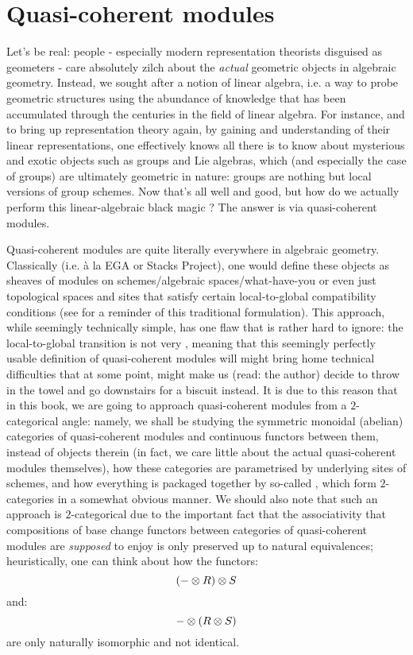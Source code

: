    \section{Quasi-coherent modules} \label{section: qcoh}
        Let's be real: people - especially modern representation theorists disguised as geometers - care absolutely zilch about the \textit{actual} geometric objects in algebraic geometry. Instead, we sought after a notion of  linear algebra, i.e. a way to probe geometric structures using the abundance of knowledge that has been accumulated through the centuries in the field of linear algebra. For instance, and to bring up representation theory again, by gaining and understanding of their linear representations, one effectively knows all there is to know about mysterious and exotic objects such as groups and Lie algebras, which (and especially the case of groups) are ultimately geometric in nature: groups are nothing but local versions of group schemes. Now that's all well and good, but how do we actually perform this linear-algebraic black magic ? The answer is via quasi-coherent modules.
        
        Quasi-coherent modules are quite literally everywhere in algebraic geometry. Classically (i.e. \`a la EGA or Stacks Project), one would define these objects as sheaves of modules on schemes/algebraic spaces/what-have-you or even just topological spaces and sites that satisfy certain local-to-global compatibility conditions (see \cite[\href{https://stacks.math.columbia.edu/tag/01BD}{Tag 01BD}]{stacks} for a reminder of this traditional formulation). This approach, while seemingly technically simple, has one flaw that is rather hard to ignore: the local-to-global transition is not very , meaning that this seemingly perfectly usable definition of quasi-coherent modules will might bring home technical difficulties that at some point, might make us (read: the author) decide to throw in the towel and go downstairs for a biscuit instead. It is due to this reason that in this book, we are going to approach quasi-coherent modules from a $2$-categorical angle: namely, we shall be studying the symmetric monoidal (abelian) categories of quasi-coherent modules and continuous functors between them, instead of objects therein (in fact, we care little about the actual quasi-coherent modules themselves), how these categories are parametrised by underlying sites of schemes, and how everything is packaged together by so-called , which form $2$-categories in a somewhat obvious manner. We should also note that such an approach is $2$-categorical due to the important fact that the associativity that compositions of base change functors between categories of quasi-coherent modules are \textit{supposed} to enjoy is only preserved up to natural equivalences; heuristically, one can think about how the functors:
            $$(- \tensor R) \tensor S$$
        and:
            $$- \tensor (R \tensor S)$$
        are only naturally isomorphic and not identical. 
        
